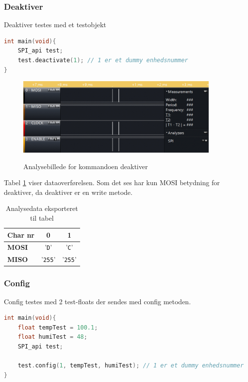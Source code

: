 \subsubsection*{Deaktiver}
Deaktiver testes med et testobjekt

\begin{lstlisting}[language=C]
int main(void){
	SPI_api test;
	test.deactivate(1); // 1 er et dummy enhedsnummer
}
\end{lstlisting}

\begin{figure}[H]
\centering
{\includegraphics[width=0.90\textwidth]{filer/integrationstest/billeder/spi_deactivate}}
\caption{Analysebillede for kommandoen deaktiver}
\label{lab:scop_deactivate}
\end{figure}

Tabel \ref{table:scop_deactivate} viser dataoverførelsen. Som det ses har kun MOSI betydning for deaktiver, da deaktiver er en write metode. 

\begin{table}[h]
	\caption{Analysedata eksporteret til tabel}
	\centering
	\begin{tabular}{|l|c|c|}
		\hline 
		\textbf{Char nr} & \textbf{0} & \textbf{1} \\ 		
		\hline 
		\textbf{MOSI} & '\verb+D+' & '\verb+C+' \\ 
		\hline 
		\textbf{MISO} & '\verb+255+' & '\verb+255+' \\ 
		\hline 
	\end{tabular} 
	\label{table:scop_deactivate}
\end{table}


\subsubsection*{Config}
Config testes med 2 test-floats der sendes med config metoden.

\begin{lstlisting}[language=C]
int main(void){
	float tempTest = 100.1;
	float humiTest = 48;
	SPI_api test;
	
	test.config(1, tempTest, humiTest); // 1 er et dummy enhedsnummer
}
\end{lstlisting}



